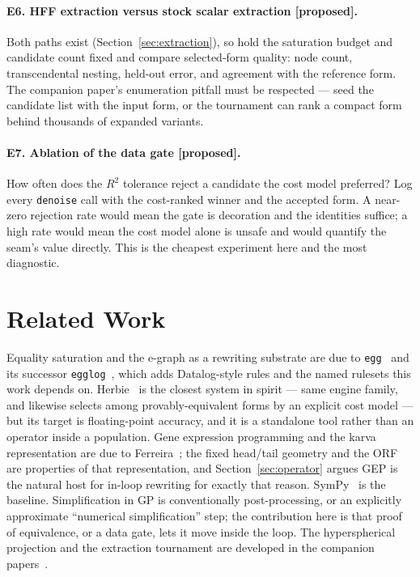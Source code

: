 \documentclass[sigconf]{acmart}
\begin{document}
\paragraph{E6. HFF extraction versus stock scalar extraction [proposed].} Both
paths exist (Section~\ref{sec:extraction}), so hold the saturation budget and
candidate count fixed and compare selected-form quality: node count, transcendental
nesting, held-out error, and agreement with the reference form. The companion
paper's enumeration pitfall must be respected --- seed the candidate list with the
input form, or the tournament can rank a compact form behind thousands of
expanded variants.

\paragraph{E7. Ablation of the data gate [proposed].} How often does the $R^2$
tolerance reject a candidate the cost model preferred? Log every
\texttt{denoise} call with the cost-ranked winner and the accepted form. A near-zero
rejection rate would mean the gate is decoration and the identities suffice; a
high rate would mean the cost model alone is unsafe and would quantify the seam's
value directly. This is the cheapest experiment here and the most diagnostic.

\section{Related Work}
\label{sec:related}

Equality saturation and the e-graph as a rewriting substrate are due to
\texttt{egg}~\cite{egg} and its successor \texttt{egglog}~\cite{egglog}, which
adds Datalog-style rules and the named rulesets this work depends on.
Herbie~\cite{herbie} is the closest system in spirit --- same engine family, and
likewise selects among provably-equivalent forms by an explicit cost model ---
but its target is floating-point accuracy, and it is a standalone tool rather
than an operator inside a population. Gene expression programming and the karva
representation are due to Ferreira~\cite{ferreira2001}; the fixed head/tail
geometry and the ORF are properties of that representation, and
Section~\ref{sec:operator} argues GEP is the natural host for in-loop rewriting
for exactly that reason. SymPy~\cite{sympy} is the baseline. Simplification in GP
is conventionally post-processing, or an explicitly approximate ``numerical
simplification'' step; the contribution here is that proof of equivalence, or a
data gate, lets it move inside the loop. The hyperspherical projection and the
extraction tournament are developed in the companion
papers~\cite{morgan2026hff,morgan2026tournaments}.
\end{document}
